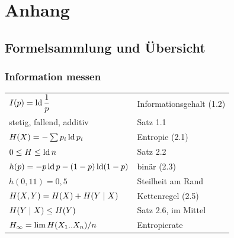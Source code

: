 \appendix
\part{Anhang}

\newcommand{\lit}[3]{\vspace{5pt}\noindent\textbf{[#1]} #2\par\nopagebreak\vspace{1pt}{\small\itshape\color{grau} #3}\par\vspace{2pt}}

\chapter{Formelsammlung und Übersicht}

\section{Information messen}

\begin{merksatz}
\begin{center}
{\small
\renewcommand{\arraystretch}{1.62}
\begin{tabular}{@{}P{4.4cm}P{4.2cm}@{}}
\toprule
$I(p) = \operatorname{ld}\dfrac1p$ & Informationsgehalt (1.2)\\
stetig, fallend, additiv & Satz 1.1\\
$H(X) = -\sum p_i\operatorname{ld} p_i$ & Entropie (2.1)\\
$0 \le H \le \operatorname{ld} n$ & Satz 2.2\\
$h(p) = -p\operatorname{ld} p-(1-p)\operatorname{ld}(1-p)$ & binär (2.3)\\
$h(0{,}11) = 0{,}5$ & Steilheit am Rand\\
$H(X,Y) = H(X)+H(Y\mid X)$ & Kettenregel (2.5)\\
$H(Y\mid X) \le H(Y)$ & Satz 2.6, im Mittel\\
$H_\infty = \lim H(X_1..X_n)/n$ & Entropierate\\
\bottomrule
\end{tabular}}
\end{center}
\end{merksatz}

